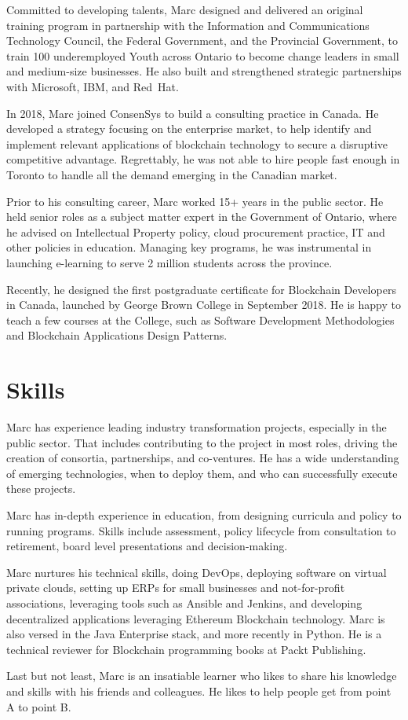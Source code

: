 \documentclass[11pt,letterpaper,sans]{moderncv}        %
\begin{document}
Committed to developing talents, Marc designed and delivered an original training program in partnership with the Information and Communications Technology Council, the Federal Government, and the Provincial Government, to train 100 underemployed Youth across Ontario to become change leaders in small and medium-size businesses.
He also built and strengthened strategic partnerships with Microsoft, IBM, and Red~Hat.

In 2018, Marc joined ConsenSys to build a consulting practice in Canada.
He developed a strategy focusing on the enterprise market, to help identify and implement relevant applications of blockchain technology to secure a disruptive competitive advantage.
Regrettably, he was not able to hire people fast enough in Toronto to handle all the demand emerging in the Canadian market.

Prior to his consulting career, Marc worked 15+ years in the public sector.
He held senior roles as a subject matter expert in the Government of Ontario, where he advised on Intellectual Property policy, cloud procurement practice, IT and other policies in education.
Managing key programs, he was instrumental in launching e-learning to serve 2 million students across the province.

Recently, he designed the first postgraduate certificate for Blockchain Developers in Canada, launched by George Brown College in September 2018.
He is happy to teach a few courses at the College, such as Software Development Methodologies and Blockchain Applications Design Patterns.

\section{Skills}
Marc has experience leading industry transformation projects, especially in the public sector.
That includes contributing to the project in most roles, driving the creation of consortia, partnerships, and co-ventures.
He has a wide understanding of emerging technologies, when to deploy them, and who can successfully execute these projects.

Marc has in-depth experience in education, from designing curricula and policy to running programs.
Skills include assessment, policy lifecycle from consultation to retirement, board level presentations and decision-making.

Marc nurtures his technical skills, doing DevOps, deploying software on virtual private clouds, setting up ERPs for small businesses and not-for-profit associations, leveraging tools such as Ansible and Jenkins, and developing decentralized applications leveraging Ethereum Blockchain technology.
Marc is also versed in the Java Enterprise stack, and more recently in Python.
He is a technical reviewer for Blockchain programming books at Packt Publishing.

Last but not least, Marc is an insatiable learner who likes to share his knowledge and skills with his friends and colleagues.
He likes to help people get from point A to point B.
\end{document}
